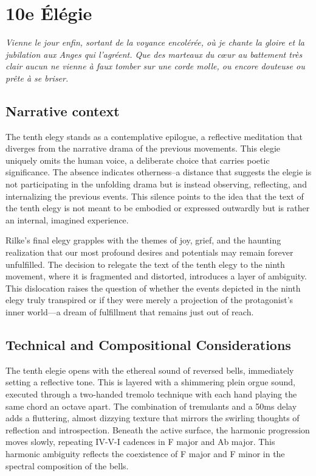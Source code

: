 \documentclass[12pt,twoside,maitrise]{dms_ks}
\theoremstyle{definition}
\begin{document}

\section{10e Élégie}

\epigraph{\textit{Vienne le jour enfin, sortant de la voyance encolérée, où je chante la gloire et la jubilation aux Anges qui l’agréent. Que des marteaux du cœur au battement très clair aucun ne vienne à faux tomber sur une corde molle, ou encore douteuse ou prête à se briser.}}{}

\subsection{Narrative context}

The tenth elegy stands as a contemplative epilogue, a reflective meditation that diverges from the narrative drama of the previous movements. 
This elegie uniquely omits the human voice, a deliberate choice that carries poetic significance. 
The absence indicates otherness--a distance that suggests the elegie is not participating in the unfolding drama but is instead observing, reflecting, and internalizing the previous events. 
This silence points to the idea that the text of the tenth elegy is not meant to be embodied or expressed outwardly but is rather an internal, imagined experience.

Rilke’s final elegy grapples with the themes of joy, grief, and the haunting realization that our most profound desires and potentials may remain forever unfulfilled. 
The decision to relegate the text of the tenth elegy to the ninth movement, where it is fragmented and distorted, introduces a layer of ambiguity. 
This dislocation raises the question of whether the events depicted in the ninth elegy truly transpired or if they were merely a projection of the protagonist's inner world—a dream of fulfillment that remains just out of reach.

\subsection{Technical and Compositional Considerations}

The tenth elegie opens with the ethereal sound of reversed bells, immediately setting a reflective tone. 
This is layered with a shimmering plein orgue sound, executed through a two-handed tremolo technique with each hand playing the same chord an octave apart. 
The combination of tremulants and a 50ms delay adds a fluttering, almost dizzying texture that mirrors the swirling thoughts of reflection and introspection. 
Beneath the active surface, the harmonic progression moves slowly, repeating IV-V-I cadences in F major and Ab major. 
This harmonic ambiguity reflects the coexistence of F major and F minor in the spectral composition of the bells.
\end{document}

